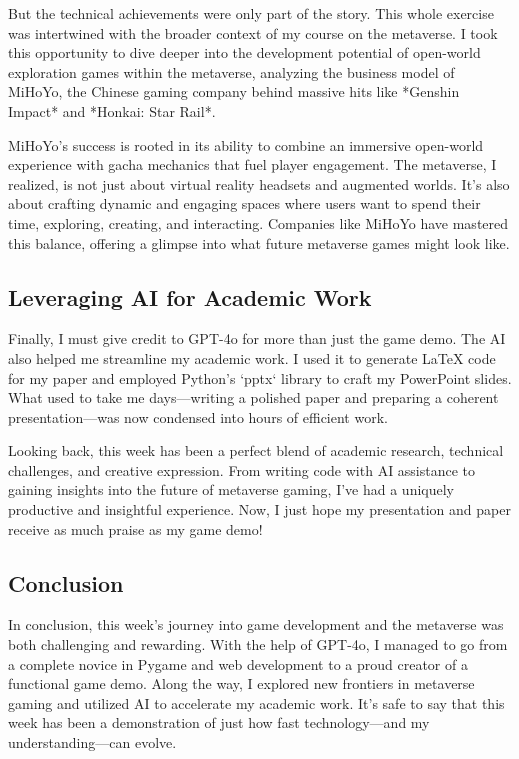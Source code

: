 \documentclass[a4paper]{article} 	%
\begin{document}
But the technical achievements were only part of the story. This whole exercise was intertwined with the broader context of my course on the metaverse. I took this opportunity to dive deeper into the development potential of open-world exploration games within the metaverse, analyzing the business model of MiHoYo, the Chinese gaming company behind massive hits like *Genshin Impact* and *Honkai: Star Rail*.

MiHoYo’s success is rooted in its ability to combine an immersive open-world experience with gacha mechanics that fuel player engagement. The metaverse, I realized, is not just about virtual reality headsets and augmented worlds. It’s also about crafting dynamic and engaging spaces where users want to spend their time, exploring, creating, and interacting. Companies like MiHoYo have mastered this balance, offering a glimpse into what future metaverse games might look like.

\subsection*{Leveraging AI for Academic Work}

Finally, I must give credit to GPT-4o for more than just the game demo. The AI also helped me streamline my academic work. I used it to generate LaTeX code for my paper and employed Python’s `pptx` library to craft my PowerPoint slides. What used to take me days—writing a polished paper and preparing a coherent presentation—was now condensed into hours of efficient work.

Looking back, this week has been a perfect blend of academic research, technical challenges, and creative expression. From writing code with AI assistance to gaining insights into the future of metaverse gaming, I’ve had a uniquely productive and insightful experience. Now, I just hope my presentation and paper receive as much praise as my game demo!

\subsection*{Conclusion}

In conclusion, this week’s journey into game development and the metaverse was both challenging and rewarding. With the help of GPT-4o, I managed to go from a complete novice in Pygame and web development to a proud creator of a functional game demo. Along the way, I explored new frontiers in metaverse gaming and utilized AI to accelerate my academic work. It’s safe to say that this week has been a demonstration of just how fast technology—and my understanding—can evolve.
\end{document}
